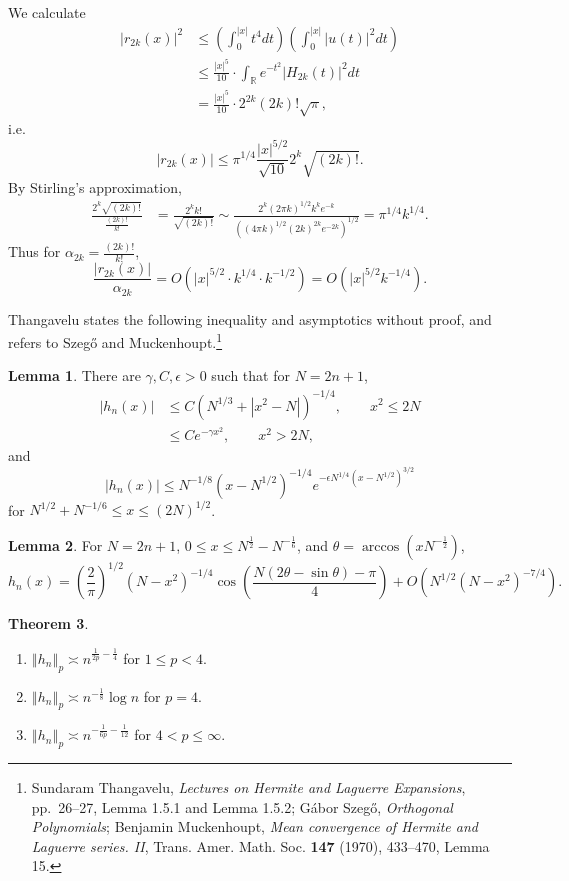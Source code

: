 \documentclass{article}
\newcommand{\norm}[1]{\left\Vert #1 \right\Vert}
\theoremstyle{definition}
\newtheorem{theorem}{Theorem}
\newtheorem{lemma}[theorem]{Lemma}
\theoremstyle{definition}
\begin{document}
We calculate
\begin{align*}
|r_{2k}(x)|^2&\leq \left(\int_0^{|x|} t^4 dt \right) \left( \int_0^{|x|} |u(t)|^2 dt \right)\\
&\leq \frac{|x|^5}{10} \cdot \int_{\mathbb{R}} e^{-t^2}  |H_{2k}(t)|^2 dt\\
&=  \frac{|x|^5}{10} \cdot 2^{2k} (2k)! \sqrt{\pi},
\end{align*}
i.e.
\[
|r_{2k}(x)| \leq \pi^{1/4} \frac{|x|^{5/2}}{\sqrt{10}} 2^k \sqrt{(2k)!}.
\]
By Stirling's approximation,
\begin{align*}
\frac{2^k \sqrt{(2k)!}}{\frac{(2k)!}{k!}}&=  \frac{2^k k!}{\sqrt{(2k)!}}
\sim \frac{2^k (2\pi k)^{1/2} k^k e^{-k}}{((4\pi k)^{1/2} (2k)^{2k} e^{-2k})^{1/2}}
=\pi^{1/4} k^{1/4}.
\end{align*}
Thus for $\alpha_{2k} = \frac{(2k)!}{k!}$, 
\[
\frac{|r_{2k}(x)|}{\alpha_{2k}}  = O(|x|^{5/2} \cdot k^{1/4} \cdot k^{-1/2})
=O(|x|^{5/2} k^{-1/4}). 
\]

Thangavelu states the following inequality and asymptotics without proof, and refers to
Szeg\H{o} and Muckenhoupt.\footnote{Sundaram Thangavelu, {\em Lectures on Hermite and Laguerre Expansions},
pp.~26--27, Lemma 1.5.1 and Lemma 1.5.2;
G\'abor Szeg\H{o}, {\em Orthogonal Polynomials};
Benjamin Muckenhoupt, {\em Mean convergence of Hermite and Laguerre series. II},
Trans. Amer. Math. Soc. \textbf{147} (1970), 433--470, Lemma 15.}

\begin{lemma}
There are $\gamma,C,\epsilon>0$ such that
for $N=2n+1$,
\begin{align*}
|h_n(x)|&\leq C(N^{1/3} + |x^2-N|)^{-1/4},\qquad x^2 \leq 2N\\
&\leq Ce^{-\gamma x^2},\qquad x^2>2N,
\end{align*}
and
\[
|h_n(x)| \leq N^{-1/8} (x-N^{1/2})^{-1/4} e^{-\epsilon N^{1/4}(x-N^{1/2})^{3/2}}
\]
for $N^{1/2}+N^{-1/6} \leq x \leq (2N)^{1/2}$. 
\end{lemma}


\begin{lemma}
For $N=2n+1$,
$0 \leq x \leq N^{\frac{1}{2}}-N^{-\frac{1}{6}}$, and $\theta=\arccos(xN^{-\frac{1}{2}})$,
\[
h_n(x) = \left(\frac{2}{\pi}\right)^{1/2} (N-x^2)^{-1/4} \cos \left( \frac{N(2\theta-\sin\theta)-\pi}{4}\right)
+O(N^{1/2}(N-x^2)^{-7/4}).
\]
\end{lemma}

\begin{theorem}
\begin{enumerate}
\item $\norm{h_n}_p \asymp n^{\frac{1}{2p}-\frac{1}{4}}$ for $1 \leq p < 4$.
\item $\norm{h_n}_p \asymp n^{-\frac{1}{8}} \log n$ for $p=4$.
\item $\norm{h_n}_p \asymp n^{-\frac{1}{6p}-\frac{1}{12}}$ for $4<p \leq \infty$. 
\end{enumerate}
\end{theorem}
\end{document}
